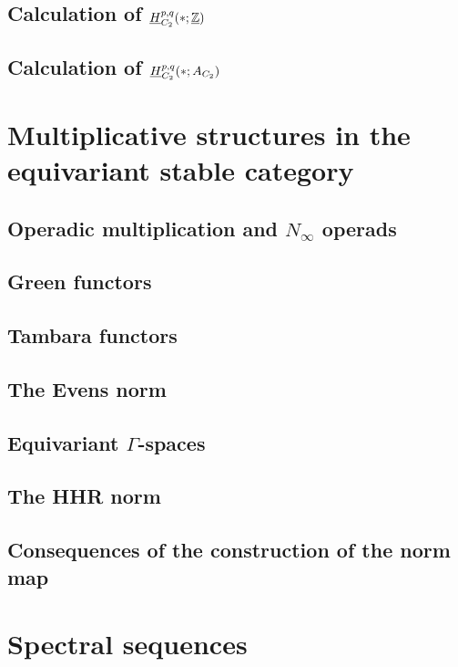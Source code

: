 \documentclass[openany]{style_EHT}
\begin{document}
\section{Calculation of $\protect\underline H_{C_2}^{p,q}(*; \protect\underline{\mathbb Z})$}
	
\section{Calculation of $\protect\underline H_{C_2}^{p,q}(*; A_{C_2})$}
	

\chapter{Multiplicative structures in the equivariant stable category}
\section{Operadic multiplication and $N_\infty$ operads}
	
\section{Green functors}
	
\section{Tambara functors}
	
\section{The Evens norm}
	
\section{Equivariant $\Gamma$-spaces}
	
\section{The HHR norm}
	
\section{Consequences of the construction of the norm map}
	

\chapter{Spectral sequences}
\end{document}

